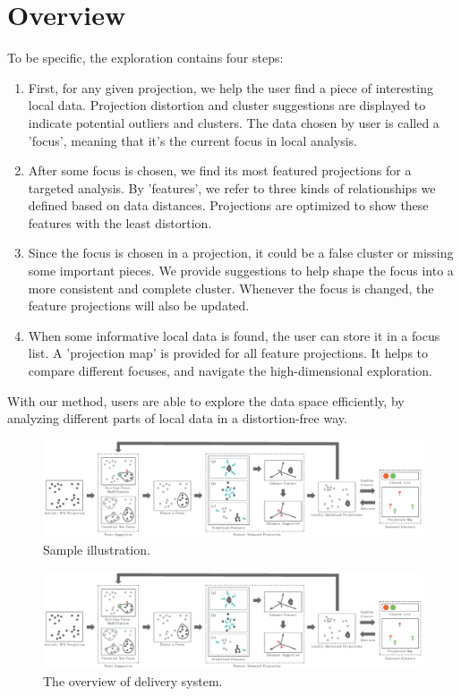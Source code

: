 \section{Overview}

To be specific, the exploration contains four steps:
\begin{enumerate}[(1)]
 \item First, for any given projection, we help the user find a piece of interesting local data. Projection distortion and cluster suggestions are displayed to indicate potential outliers and clusters. The data chosen by user is called a 'focus', meaning that it's the current focus in local analysis.
 \item After some focus is chosen, we find its most featured projections for a targeted analysis. By 'features', we refer to three kinds of relationships we defined based on data distances. Projections are optimized to show these features with the least distortion.
 \item Since the focus is chosen in a projection, it could be a false cluster or missing some important pieces. We provide suggestions to help shape the focus into a more consistent and complete cluster. Whenever the focus is changed, the feature projections will also be updated.
 \item When some informative local data is found, the user can store it in a focus list. A 'projection map' is provided for all feature projections. It helps to compare different focuses, and navigate the high-dimensional exploration.
\end{enumerate}
 With our method, users are able to explore the data space efficiently, by analyzing different parts of local data in a distortion-free way.

\ifx
\begin{figure}[htb]
\centering
\includegraphics{images/Pipeline.eps}
\caption{Sample illustration.}
\end{figure}
\else
\begin{figure}[htbp]
\centering
  \includegraphics[width=1\linewidth]{images/Pipeline.eps}%
  \caption{The overview of delivery system.}\label{fig.2}
  \end{figure}
  \fi